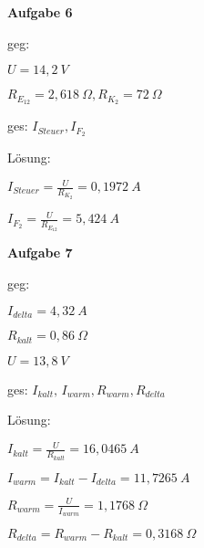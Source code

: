 \textbf{Aufgabe 6}

geg:

$U = 14,2~V$

$R_{E_{12}} = 2,618~\Omega, R_{K_2} = 72~\Omega$

ges: $I_{Steuer}, I_{F_2}$

Lösung:

$I_{Steuer} = \frac{U}{R_{K_2}} = 0,1972~A$

$I_{F_2} = \frac{U}{R_{E_{12}}} = 5,424~A$

\newpage

\textbf{Aufgabe 7}

geg:

$I_{delta} = 4,32~A$

$R_{kalt} = 0,86~\Omega$

$U = 13,8~V$

ges: $I_{kalt},\, I_{warm}, R_{warm}, R_{delta}$

Lösung:

$I_{kalt} = \frac{U}{R_{kalt}} = 16,0465~A$

$I_{warm} = I_{kalt} - I_{delta} = 11,7265~A$

$R_{warm} = \frac{U}{I_{warm}} = 1,1768~\Omega$

$R_{delta} = R_{warm} - R_{kalt} = 0,3168~\Omega$

